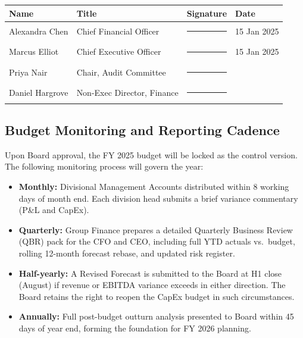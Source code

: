 \vspace{6pt}
\begin{center}
\renewcommand{\arraystretch}{1.8}
\begin{tabular}{L{3.8cm} L{3.4cm} C{3.2cm} C{2.4cm}}
  \toprule
  \color{white}\textbf{Name} &
  \color{white}\textbf{Title} &
  \color{white}\textbf{Signature} &
  \color{white}\textbf{Date} \\
  \midrule
  Alexandra Chen   & Chief Financial Officer      & \rule{3cm}{0.4pt} & 15 Jan 2025 \\
  Marcus Elliot    & Chief Executive Officer      & \rule{3cm}{0.4pt} & 15 Jan 2025 \\
  Priya Nair       & Chair, Audit Committee       & \rule{3cm}{0.4pt} & \phantom{15 Jan 2025} \\
  Daniel Hargrove  & Non-Exec Director, Finance   & \rule{3cm}{0.4pt} & \phantom{15 Jan 2025} \\
  \bottomrule
\end{tabular}
\end{center}

\vspace{8pt}

\subsection{Budget Monitoring and Reporting Cadence}

Upon Board approval, the FY 2025 budget will be locked as the control version.
The following monitoring process will govern the year:

\begin{itemize}
  \item \textbf{Monthly:} Divisional Management Accounts distributed within 8 working
        days of month end. Each division head submits a brief variance commentary
        (P\&L and CapEx).
  \item \textbf{Quarterly:} Group Finance prepares a detailed Quarterly Business
        Review (QBR) pack for the CFO and CEO, including full YTD actuals vs.\ budget,
        rolling 12-month forecast rebase, and updated risk register.
  \item \textbf{Half-yearly:} A Revised Forecast is submitted to the Board at H1
        close (August) if revenue or EBITDA variance exceeds  in either
        direction. The Board retains the right to reopen the CapEx budget in
        such circumstances.
  \item \textbf{Annually:} Full post-budget outturn analysis presented to Board
        within 45 days of year end, forming the foundation for FY 2026 planning.
\end{itemize}

